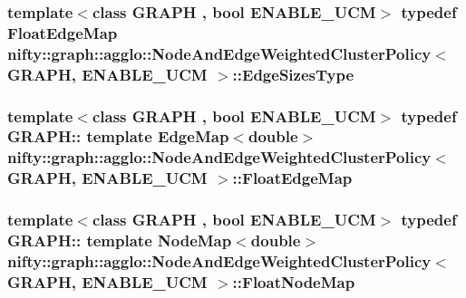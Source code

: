 \subsubsection[{Edge\+Sizes\+Type}]{\setlength{\rightskip}{0pt plus 5cm}template$<$class G\+R\+A\+P\+H , bool E\+N\+A\+B\+L\+E\+\_\+\+U\+C\+M$>$ typedef {\bf Float\+Edge\+Map} {\bf nifty\+::graph\+::agglo\+::\+Node\+And\+Edge\+Weighted\+Cluster\+Policy}$<$ G\+R\+A\+P\+H, E\+N\+A\+B\+L\+E\+\_\+\+U\+C\+M $>$\+::{\bf Edge\+Sizes\+Type}}\label{classnifty_1_1graph_1_1agglo_1_1NodeAndEdgeWeightedClusterPolicy_a3026f9b9f7061857a7d6c833c1b2fafb}
\hypertarget{classnifty_1_1graph_1_1agglo_1_1NodeAndEdgeWeightedClusterPolicy_ad96ecbc93cd5424b2d5dd013439820ca}{}
\subsubsection[{Float\+Edge\+Map}]{\setlength{\rightskip}{0pt plus 5cm}template$<$class G\+R\+A\+P\+H , bool E\+N\+A\+B\+L\+E\+\_\+\+U\+C\+M$>$ typedef G\+R\+A\+P\+H\+:: template Edge\+Map$<$double$>$ {\bf nifty\+::graph\+::agglo\+::\+Node\+And\+Edge\+Weighted\+Cluster\+Policy}$<$ G\+R\+A\+P\+H, E\+N\+A\+B\+L\+E\+\_\+\+U\+C\+M $>$\+::{\bf Float\+Edge\+Map}}\label{classnifty_1_1graph_1_1agglo_1_1NodeAndEdgeWeightedClusterPolicy_ad96ecbc93cd5424b2d5dd013439820ca}
\hypertarget{classnifty_1_1graph_1_1agglo_1_1NodeAndEdgeWeightedClusterPolicy_a0962d8b4fc0f7612af92d81d5a8b1ff6}{}
\subsubsection[{Float\+Node\+Map}]{\setlength{\rightskip}{0pt plus 5cm}template$<$class G\+R\+A\+P\+H , bool E\+N\+A\+B\+L\+E\+\_\+\+U\+C\+M$>$ typedef G\+R\+A\+P\+H\+:: template Node\+Map$<$double$>$ {\bf nifty\+::graph\+::agglo\+::\+Node\+And\+Edge\+Weighted\+Cluster\+Policy}$<$ G\+R\+A\+P\+H, E\+N\+A\+B\+L\+E\+\_\+\+U\+C\+M $>$\+::{\bf Float\+Node\+Map}}\label{classnifty_1_1graph_1_1agglo_1_1NodeAndEdgeWeightedClusterPolicy_a0962d8b4fc0f7612af92d81d5a8b1ff6}
\hypertarget{classnifty_1_1graph_1_1agglo_1_1NodeAndEdgeWeightedClusterPolicy_a293d476ffc7b8513eeb20c21bfefb579}{}
